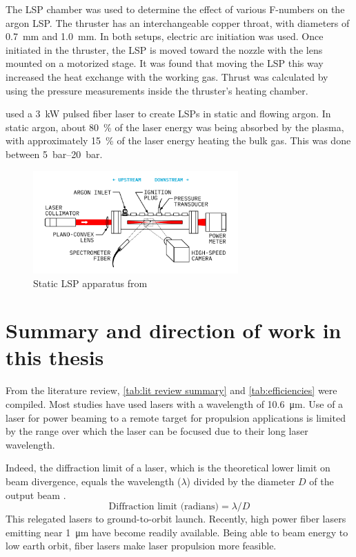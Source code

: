         The LSP chamber was used to determine the effect of various F-numbers on the argon LSP. The thruster has an interchangeable copper throat, with diameters of \qty{0.7}{mm} and \qty{1.0}{mm}. In both setups, electric arc initiation was used. Once initiated in the thruster, the LSP is moved toward the nozzle with the lens mounted on a motorized stage. It was found that moving the LSP this way increased the heat exchange with the working gas. Thrust was calculated by using the pressure measurements inside the thruster's heating chamber.


        \textcite{duplayArgonLaserPlasmaThruster2024a} used a \qty{3}{kW} pulsed fiber laser to create LSPs in static and flowing argon. In static argon, about \qty{80}{\%} of the laser energy was being absorbed by the plasma, with approximately \qty{15}{\%} of the laser energy heating the bulk gas. This was done between \qtyrange{5}{20}{bar}.
        \begin{figure}[!ht]
            \centering
            \includegraphics[width=0.7\textwidth]{assets/2 background/finalsetup_static.pdf}
            \caption{Static LSP apparatus from \textcite{duplayArgonLaserPlasmaThruster2024a}}
            \label{fig:Duplay apparatus}
        \end{figure}

    \section{Summary and direction of work in this thesis}
        
        From the literature review, \autoref{tab:lit review summary} and \autoref{tab:efficiencies} were compiled. Most studies have used  lasers with a wavelength of \qty{10.6}{μm}. Use of a  laser for power beaming to a remote target for propulsion applications is limited by the range over which the laser can be focused due to their long laser wavelength. 
    
        Indeed, the diffraction limit of a laser, which is the theoretical lower limit on beam divergence, equals the wavelength ($\lambda$) divided by the diameter $D$ of the output beam \cite{hechtUnderstandingLasersEntry2019}.
        \[
        \text{Diffraction limit (radians)} = \lambda/D
        \]
        This relegated  lasers to ground-to-orbit launch. Recently, high power fiber lasers emitting near \qty{1}{μm} have become readily available. Being able to beam energy to low earth orbit, fiber lasers make laser propulsion more feasible.

